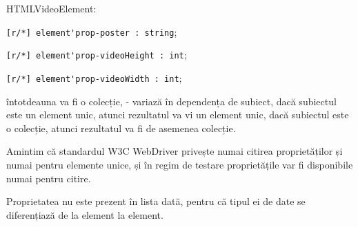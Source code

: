 \begin{icItems}
	\item HTMLVideoElement:
	\begin{icItems}
		\item \lstinline|[r/*] element'prop-poster : string|;
		\item \lstinline|[r/*] element'prop-videoHeight : int|;
		\item \lstinline|[r/*] element'prop-videoWidth : int|;
	\end{icItems}
	
\end{icItems}

 întotdeauna va fi o colecție,  - variază în dependența de subiect, dacă subiectul este un element unic, atunci rezultatul va vi un element unic, dacă subiectul este o colecție, atunci rezultatul va fi de asemenea colecție. 

Amintim că standardul W3C WebDriver privește numai citirea proprietăților și numai pentru elemente unice, și în regim de testare proprietățile var fi disponibile numai pentru citire.

Proprietatea  nu este prezent în lista dată, pentru că tipul ei de date se diferențiază de la element la element.

